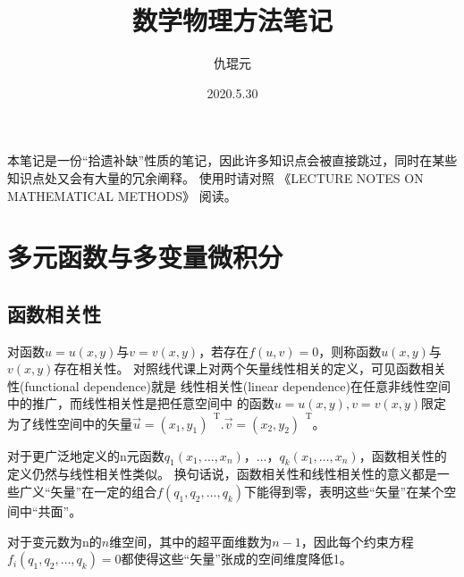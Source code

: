 \documentclass[UTF8]{ctexart}
\newcommand{\tr}{\mathop{}\!\mathrm{T}}
\begin{document}
\begin{titlepage}
  \title{数学物理方法笔记}

\author{仇琨元}
\date{2020.5.30}
\maketitle
\end{titlepage}

本笔记是一份“拾遗补缺”性质的笔记，因此许多知识点会被直接跳过，同时在某些知识点处又会有大量的冗余阐释。
使用时请对照 《LECTURE NOTES ON MATHEMATICAL METHODS》 阅读。
\section{多元函数与多变量微积分}
\subsection{函数相关性}
对函数$u=u(x,y)$与$v=v(x,y)$，若存在$f(u,v)=0$，则称函数$u(x,y)$与$v(x,y)$存在相关性。
对照线代课上对两个矢量线性相关的定义，可见函数相关性(functional dependence)就是
线性相关性(linear dependence)在任意非线性空间中的推广，而线性相关性是把任意空间中
的函数$u=u(x,y),v=v(x,y)$限定为了线性空间中的矢量$\vec{u}=(x_{1},y_{1})^{\tr}.\vec{v}=(x_{2},y_{2})^{\tr}$。

对于更广泛地定义的n元函数$q_{1} (x_{1},\dots,x_{n})$，$\dots$，$q_{k} (x_{1},\dots,{x_{n}})$，函数相关性的定义仍然与线性相关性类似。
换句话说，函数相关性和线性相关性的意义都是一些广义“矢量”在一定的组合$f(q_{1},q_{2},\dots,q_{k})$下能得到零，表明这些“矢量”在某个空间中“共面”。

对于变元数为n的$n$维空间，其中的超平面维数为$n-1$，因此每个约束方程 $f_{i} (q_{1},q_{2},\dots,q_{k})=0$都使得这些“矢量”张成的空间维度降低1。
\end{document}
